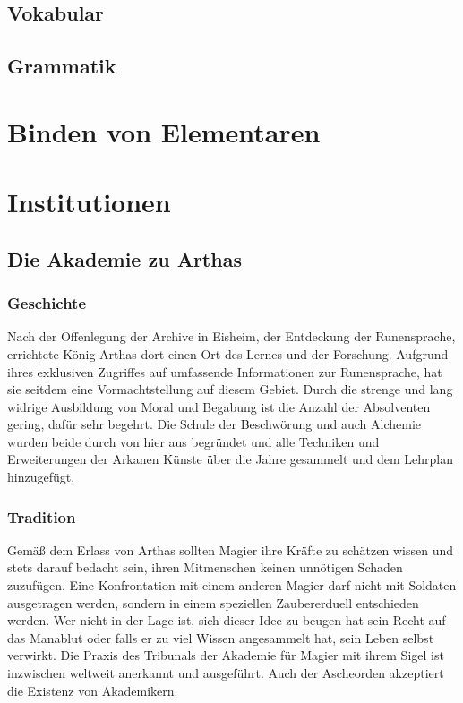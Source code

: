 \documentclass[a4paper,12pt,oneside]{book}
\begin{document}
\chapter{Vokabular}

\chapter{Grammatik}

\part{Binden von Elementaren}

\part{Institutionen}

\chapter{Die Akademie zu Arthas}

\section{Geschichte}
Nach der Offenlegung der Archive in Eisheim, der Entdeckung der Runensprache, errichtete König Arthas dort einen Ort des Lernes und der Forschung. Aufgrund ihres exklusiven Zugriffes auf umfassende Informationen zur Runensprache, hat sie seitdem eine Vormachtstellung auf diesem Gebiet. Durch die strenge und lang widrige Ausbildung von Moral und Begabung ist die Anzahl der Absolventen gering, dafür sehr begehrt. Die Schule der Beschwörung und auch Alchemie wurden beide durch von hier aus begründet und alle Techniken und Erweiterungen der Arkanen Künste über die Jahre gesammelt und dem Lehrplan hinzugefügt.

\section{Tradition}
Gemäß dem Erlass von Arthas sollten Magier ihre Kräfte zu schätzen wissen und stets darauf bedacht sein, ihren Mitmenschen keinen unnötigen Schaden zuzufügen. Eine Konfrontation mit einem anderen Magier darf nicht mit Soldaten ausgetragen werden, sondern in einem speziellen Zaubererduell entschieden werden. Wer nicht in der Lage ist, sich dieser Idee zu beugen hat sein Recht auf das Manablut oder falls er zu viel Wissen angesammelt hat, sein Leben selbst verwirkt. Die Praxis des Tribunals der Akademie für Magier mit ihrem Sigel ist inzwischen weltweit anerkannt und ausgeführt. Auch der Ascheorden akzeptiert die Existenz von Akademikern.
\end{document}
